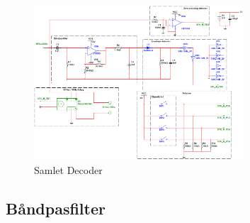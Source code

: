 \begin{figure}[htbp]
	\centering
	\includegraphics[width=0.70\textwidth]{billeder/HWdesign/Decoder}
	\caption{Samlet Decoder}
	\label{fig:Decoder}
\end{figure}


\newpage

\subsection{Båndpasfilter}

